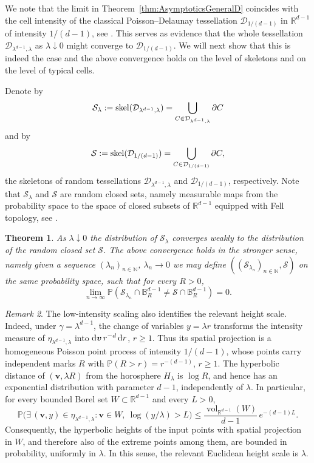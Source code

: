 \documentclass[11pt,a4paper]{article}
\theoremstyle{plain}
\newtheorem{theorem}{Theorem}
\theoremstyle{definition}
\theoremstyle{remark}
\newtheorem{remark}[theorem]{Remark}
\newcommand{\dint}{\textup{d}}
\newcommand{\vol}{\mathop{\mathrm{vol}}\nolimits}
\newcommand{\bv}{\boldsymbol{v}}
\def\BB{\mathbb{B}}
\def\NN{\mathbb{N}}
\def\PP{\mathbb{P}}
\def\RR{\mathbb{R}}
\def\cD{\mathcal{D}}
\def\cS{\mathcal{S}}
\begin{document}
We note that the limit in Theorem~\ref{thm:AsymptoticsGeneralD} coincides with the cell intensity of the classical Poisson--Delaunay tessellation $\cD_{1/(d-1)}$ in $\RR^{d-1}$ of intensity $1/(d-1)$, see \cite[Equation (10.31)]{SW}. This serves as evidence that the whole tessellation $\cD_{\lambda^{d-1},\lambda}$ as $\lambda\downarrow 0$ might converge to $\cD_{1/(d-1)}$. We will next show that this is indeed the case and the above convergence holds on the level of skeletons and on the level of typical cells.

Denote by
\[
	\cS_{\lambda}:={\rm skel}(\cD_{\lambda^{d-1},\lambda})=\bigcup_{C\in \cD_{\lambda^{d-1},\lambda}} \partial C
\]
and by
\[
	\cS:={\rm skel}(\cD_{1/(d-1)})=\bigcup_{C\in \cD_{1/(d-1)}} \partial C,
\]
the skeletons of random tessellations $\cD_{\lambda^{d-1},\lambda}$ and $\cD_{1/(d-1)}$, respectively. Note that $\cS_{\lambda}$ and $\cS$ are random closed sets, namely measurable maps from the probability space to the space of closed subsets of $\RR^{d-1}$ equipped with Fell topology, see \cite{SW}.

\begin{theorem}\label{thm:SkeletonConvergence}
	As $\lambda\downarrow 0$ the distribution of $\cS_{\lambda}$ converges weakly to the distribution of the random closed set $\cS$. The above convergence holds in the stronger sense, namely given a sequence $(\lambda_n)_{n\in\NN}$, $\lambda_n\to 0$ we may define $((\cS_{\lambda_n})_{n\in\NN}, \cS)$ on the same probability space, such that for every $R>0$,
	\[
		\lim_{n\to\infty}\PP(\cS_{\lambda_n}\cap \BB_R^{d-1}\neq \cS\cap \BB_R^{d-1})=0.
	\]
\end{theorem}

\begin{remark}
The low-intensity scaling also identifies the relevant height scale.
Indeed, under $\gamma=\lambda^{d-1}$, the change of variables
$y=\lambda r$ transforms the intensity measure of
$\eta_{\lambda^{d-1},\lambda}$ into $\dint\bv\,r^{-d}\,\dint r$, $r\geq 1$.
Thus its spatial projection is a homogeneous Poisson point process
of intensity $1/(d-1)$, whose points carry independent marks $R$ with $\PP(R>r)=r^{-(d-1)}$, $r\geq 1$.
The hyperbolic distance of $(\bv,\lambda R)$ from the horosphere
$H_\lambda$ is $\log R$, and hence has an exponential distribution
with parameter $d-1$, independently of $\lambda$. In particular, for every bounded Borel set $W\subset\RR^{d-1}$
and every $L>0$,
\[
    \PP\bigl(
        \exists\,(\bv,y)\in\eta_{\lambda^{d-1},\lambda}:
        \bv\in W,\ \log(y/\lambda)>L
    \bigr)
    \leq
    \frac{\vol_{\RR^{d-1}}(W)}{d-1}\,e^{-(d-1)L}.
\]
Consequently, the hyperbolic heights of the input points with
spatial projection in $W$, and therefore also of the extreme
points among them, are bounded in probability, uniformly in
$\lambda$. In this sense, the relevant Euclidean height scale is $\lambda$. 
\end{remark}
\end{document}
